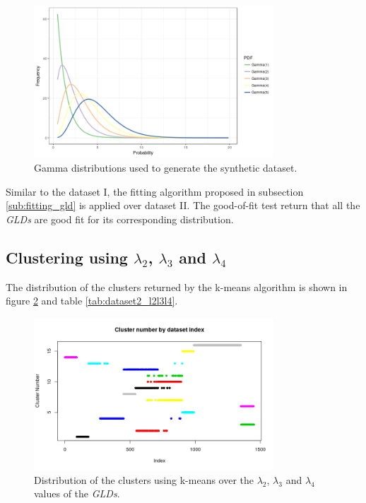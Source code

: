 \begin{figure}[H]
    \centering
    \includegraphics[width=0.8\textwidth]{img/gld_clustering/extra_images/5_gamma.png}
    \caption{Gamma distributions used to generate the synthetic dataset.}
    \label{fig:5_gamma}
\end{figure}

Similar to the dataset I, the fitting algorithm proposed in subsection \ref{sub:fitting_gld} is applied over dataset II. The good-of-fit test return that all the \textit{GLDs} are good fit for its corresponding distribution.

\subsection{Clustering using $\lambda_{2}$, $\lambda_{3}$ and $\lambda_{4}$}\label{syntheticII_l234}

The distribution of the clusters returned by the k-means algorithm is shown in figure \ref{fig:dataset2_l2l3l4} and table \ref{tab:dataset2_l2l3l4}.

\begin{figure}[H]
    \centering
    \includegraphics[width=0.8\textwidth]{img/gld_clustering/Dataset2/nuevo/clusters_by_index.png}
    \caption{Distribution of the clusters using k-means over the $\lambda_{2}$, $\lambda_{3}$ and $\lambda_{4}$ values of the \textit{GLDs}.}
    \label{fig:dataset2_l2l3l4}
\end{figure}

